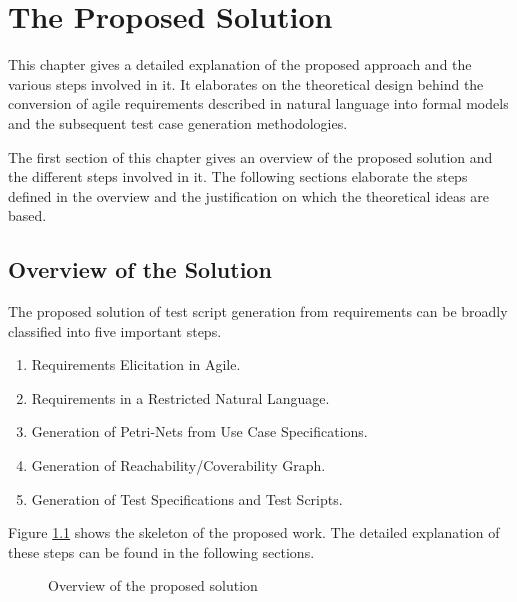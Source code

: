 \chapter{The Proposed Solution}\label{proposedsolution} 
This chapter gives a detailed explanation of the proposed approach and the various steps involved in it. It elaborates on the theoretical design behind the conversion of agile requirements described in natural language into formal models and the subsequent test case generation methodologies.
 
The first section of this chapter gives an overview of the proposed solution and the different steps involved in it. The following sections elaborate the steps defined in the overview and the justification on which the theoretical ideas are based.


\section{Overview of the Solution}
The proposed solution of test script generation from requirements can be broadly classified into five important steps.
\begin{enumerate}
\item Requirements Elicitation in Agile.
\item Requirements in a Restricted Natural Language.
\item Generation of Petri-Nets from Use Case Specifications.
\item Generation of Reachability/Coverability Graph.
\item Generation of Test Specifications and Test Scripts.
\end{enumerate}
Figure \ref{fig:proposed_solution2} shows the skeleton of the proposed work. The detailed explanation of these steps can be found in the following sections.

\begin{figure}[]
\centering
{}
\caption{Overview of the proposed solution}
\label{fig:proposed_solution2}
\end{figure}

